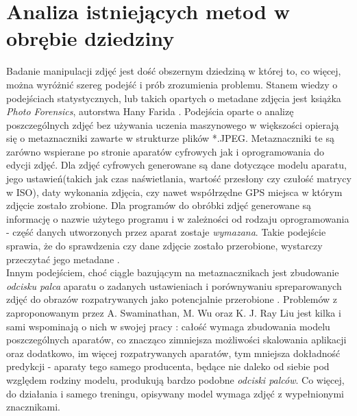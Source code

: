 \chapter{Analiza istniejących metod w obrębie dziedziny}

Badanie manipulacji zdjęć jest dość obszernym dziedziną w której to, co więcej, można wyróżnić szereg podejść i prób zrozumienia problemu. Stanem wiedzy o podejściach statystycznych, lub takich opartych o metadane zdjęcia jest książka \textit{Photo Forensics}, autorstwa Hany Farida \cite{forensics}. Podejścia oparte o analizę poszczególnych zdjęć bez używania uczenia maszynowego w większości opierają się o metaznaczniki zawarte w strukturze plików *.JPEG. Metaznaczniki te są zarówno wspierane po stronie aparatów cyfrowych jak i oprogramowania do edycji zdjęć. Dla zdjęć cyfrowych generowane są dane dotyczące modelu aparatu, jego ustawień(takich jak czas naświetlania, wartość przesłony czy czułość matrycy w ISO), daty wykonania zdjęcia, czy nawet współrzędne GPS miejsca w którym zdjęcie zostało zrobione. Dla programów do obróbki zdjęć generowane są informację o nazwie użytego programu i w zależności od rodzaju oprogramowania - część danych utworzonych przez aparat zostaje \textit{wymazana}. Takie podejście sprawia, że do sprawdzenia czy dane zdjęcie zostało przerobione, wystarczy przeczytać jego metadane \cite{forensics}.\\

Innym podejściem, choć ciągle bazującym na metaznacznikach jest zbudowanie \textit{odcisku palca} aparatu o zadanych ustawieniach i porównywaniu spreparowanych zdjęć do obrazów rozpatrywanych jako potencjalnie przerobione \cite{fingerprints}. Problemów z zaproponowanym przez A. Swaminathan, M. Wu oraz K. J. Ray Liu jest kilka i sami wspominają o nich w swojej pracy \cite{fingerprints}: całość wymaga zbudowania modelu poszczególnych aparatów, co znacząco zimniejsza możliwości skalowania aplikacji oraz dodatkowo, im więcej rozpatrywanych aparatów, tym mniejsza dokładność predykcji - aparaty tego samego producenta, będące nie daleko od siebie pod względem rodziny modelu, produkują bardzo podobne \textit{odciski palców}. Co więcej, do działania i samego treningu, opisywany model wymaga zdjęć z wypełnionymi znacznikami.\\

